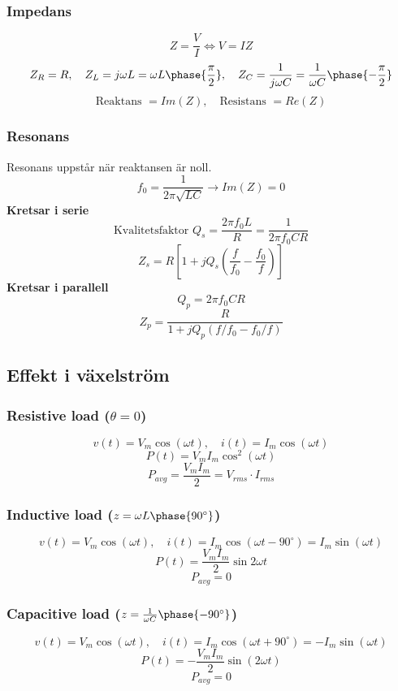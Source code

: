 \documentclass{article}
\begin{document}
\subsubsection{Impedans}
\[ Z = \frac{V}{I} \Leftrightarrow V = IZ \]
\[ Z_R = R, \quad Z_L = j \omega L = \omega L \phase{\frac{\pi}{2}}, \quad Z_C = \frac{1}{j \omega C} = \frac{1}{\omega C} \phase{-\frac{\pi}{2}} \]
\[ \textrm{Reaktans } = Im(Z), \quad \textrm{Resistans } = Re(Z) \]

\subsubsection{Resonans}
\label{sec:resonans}
Resonans uppstår när reaktansen är noll.
\[ f_0 = \frac{1}{2\pi \sqrt{LC}} \rightarrow Im(Z) = 0 \]
\textbf{Kretsar i serie}
\[ \textrm{Kvalitetsfaktor } Q_s = \frac{2\pi f_0 L}{R} = \frac{1}{2\pi f_0 CR} \]
\[ Z_s = R \left[1 + j Q_s \left( \frac{f}{f_0} - \frac{f_0}{f} \right) \right] \]
\textbf{Kretsar i parallell}
\[ Q_p = 2\pi f_0 CR \]
\[ Z_p = \frac{R}{1 + jQ_p(f/f_0-f_0/f)} \]

\subsection{Effekt i växelström}

\subsubsection{Resistive load (\(\theta = 0 \))}
\[ v(t) = V_m \cos(\omega t), \quad i(t) = I_m \cos(\omega t) \]
\[ P(t) = V_m I_m \cos^2(\omega t) \]
\[ P_{avg} = \frac{V_m I_m}{2} = V_{rms} \cdot I_{rms} \]

\subsubsection{Inductive load (\(z = \omega L \phase{90^\circ} \))}
\[ v(t) = V_m \cos(\omega t), \quad i(t) = I_m \cos(\omega t - 90^\circ) = I_m \sin(\omega t) \]
\[ P(t) = \frac{V_m I_m}{2} \sin{2\omega t} \]
\[ P_{avg} = 0 \]

\subsubsection{Capacitive load (\(z = \frac{1}{\omega C} \phase{-90^\circ} \))}
\[ v(t) = V_m \cos(\omega t), \quad i(t) = I_m\cos(\omega t + 90^\circ) = -I_m \sin(\omega t) \]
\[ P(t) = -\frac{V_m I_m}{2} \sin(2 \omega t) \]
\[ P_{avg} = 0 \] 
\end{document}
